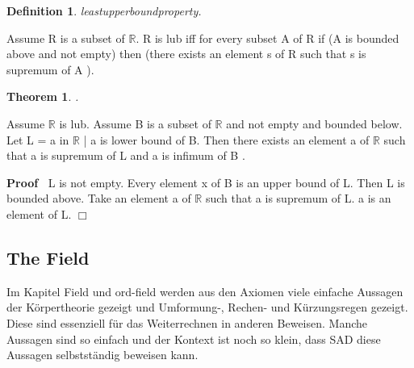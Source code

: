 \documentclass{article}
\newenvironment{forthel}{\begin{leftbar}}{\end{leftbar}}
\newenvironment{proof}{\noindent\textbf{Proof\ }}{\hspace*{\fill}$\Box$\medskip}
\newtheorem{theorem}{Theorem}
\newtheorem{definition}{Definition}
\begin{document}
\begin{forthel}
\begin{definition} leastupperboundproperty.

\end{definition}
Assume R is a subset of $\mathbb{R}$.
R is lub iff for every subset A of R
if (A is bounded above and not empty) then (there exists an element s of R such that s is supremum of A ).

\begin{theorem}
.
\end{theorem}
Assume $\mathbb{R}$ is lub.
Assume B is a subset of $\mathbb{R}$ and not empty and bounded below.
Let L = {a in $\mathbb{R}$ | a is lower bound of B}.
Then there exists an element a of $\mathbb{R}$ such that a is supremum of L and a is infimum of B .

\begin{proof}
L is not empty.
Every element x of B is an upper bound of L.
Then L is bounded above.
Take an element a of $\mathbb{R}$ such that a is supremum of L.
a is an element of L.
\end{proof}





\end{forthel}

\subsection{The Field}

Im Kapitel Field und ord-field werden aus den Axiomen viele einfache Aussagen der Körpertheorie gezeigt und Umformung-, Rechen- und Kürzungsregen gezeigt. Diese sind essenziell für das Weiterrechnen in anderen Beweisen.
Manche Aussagen sind so einfach und der Kontext ist noch so klein, dass SAD diese Aussagen selbstst\"andig beweisen kann.
\end{document}
